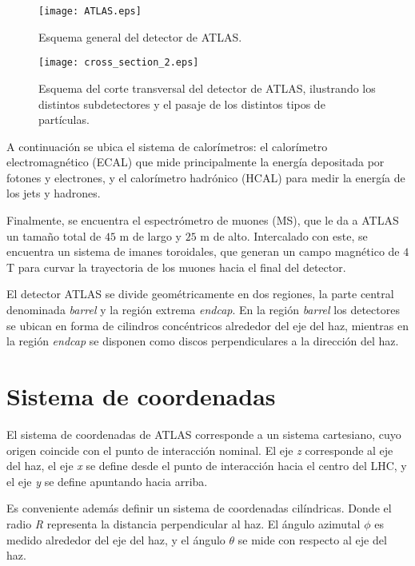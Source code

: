 \begin{figure}
\centering
\texttt{[image: ATLAS.eps]}
\caption{Esquema general del detector de ATLAS.}
\label{ATLAS}
\end{figure}

\begin{figure}
\centering
\texttt{[image: cross\_section\_2.eps]}
\caption{Esquema del corte transversal del detector de ATLAS, ilustrando los distintos subdetectores y el pasaje de los distintos tipos de partículas.}
\label{cross_section_2}
\end{figure}

A continuación se ubica el sistema de calorímetros: el calorímetro electromagnético (ECAL) que mide principalmente la energía depositada por fotones y electrones, y el calorímetro hadrónico (HCAL) para medir la energía de los jets y hadrones.

Finalmente, se encuentra el espectrómetro de muones (MS), que le da a ATLAS un tamaño total de $45$ m de largo y $25$ m de alto. Intercalado con este, se encuentra un sistema de imanes toroidales, que generan un campo magnético de $4$ T para curvar la trayectoria de los muones hacia el final del detector.

El detector ATLAS se divide geométricamente en dos regiones, la parte central denominada \textit{barrel} y la región extrema \textit{endcap}. En la región \textit{barrel} los detectores se ubican en forma de cilindros concéntricos alrededor del eje del haz, mientras en la región \textit{endcap} se disponen como discos perpendiculares a la dirección del haz. 

\section{Sistema de coordenadas}

El sistema de coordenadas de ATLAS corresponde a un sistema cartesiano, cuyo origen coincide con el punto de interacción nominal. El eje \textit{z} corresponde al eje del haz, el eje \textit{x} se define desde el punto de interacción hacia el centro del LHC, y el eje \textit{y} se define apuntando hacia arriba.

Es conveniente además definir un sistema de coordenadas cilíndricas. Donde el radio \textit{R} representa la distancia perpendicular al haz. El ángulo azimutal $\phi$ es medido alrededor del eje del haz, y el ángulo $\theta$ se mide con respecto al eje del haz. 

